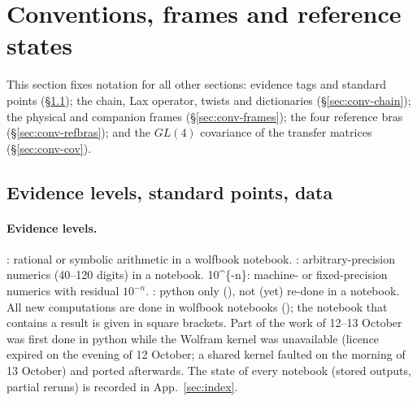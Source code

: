 \section{Conventions, frames and reference states}\label{sec:conv}

This section fixes notation for all other sections: evidence tags and standard points (\S\ref{sec:conv-evid}); the
chain, Lax operator, twists and dictionaries (\S\ref{sec:conv-chain}); the physical and companion frames
(\S\ref{sec:conv-frames}); the four reference bras (\S\ref{sec:conv-refbras}); and the $GL(4)$ covariance of the transfer
matrices (\S\ref{sec:conv-cov}).

\subsection{Evidence levels, standard points, data}\label{sec:conv-evid}

\paragraph{Evidence levels.} \ex: rational or symbolic arithmetic in a wolfbook notebook. \hp: arbitrary-precision
numerics (40--120 digits) in a notebook. \num{10^{-n}}: machine- or fixed-precision numerics with residual $10^{-n}$.
\npy: python only (), not (yet) re-done in a notebook. All new computations are done in wolfbook notebooks
(); the notebook that contains a result is given in square brackets. Part of
the work of 12--13 October was first done in python while the Wolfram kernel was unavailable (licence expired on the
evening of 12 October; a shared kernel faulted on the morning of 13 October) and ported afterwards. The state of every
notebook (stored outputs, partial reruns) is recorded in App.~\ref{sec:index}.

